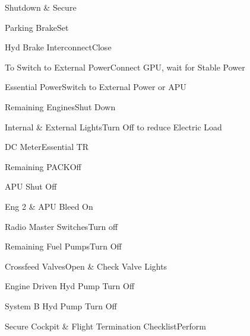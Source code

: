 \documentclass[sim-use]{checklist}
\begin{document}
\begin{checklist}{Shutdown \& Secure}
	\item{Parking Brake}{Set}
    \item{Hyd Brake Interconnect}{Close}
    \item{To Switch to External Power}{Connect GPU, wait for Stable Power}
    \item{Essential Power}{Switch to External Power or APU}
    \item{Remaining Engines}{Shut Down}
    \item{Internal \& External Lights}{Turn Off to reduce Electric Load}
    \item{DC Meter}{Essential TR}
    \item{Remaining PACK}{Off}
	 {
		\item{APU} {Shut Off}
		\item{Eng 2 \& APU Bleed} {On}
	}
	\item{Radio Master Switches}{Turn off}
	\item{Remaining Fuel Pumps}{Turn Off}
	\item{Crossfeed Valves}{Open \& Check Valve Lights}
	\item{Engine Driven Hyd Pump} {Turn Off}
	\item{System B Hyd Pump} {Turn Off}
	\item{Secure Cockpit \& Flight Termination Checklist}{Perform}
\end{checklist}
\end{document}
